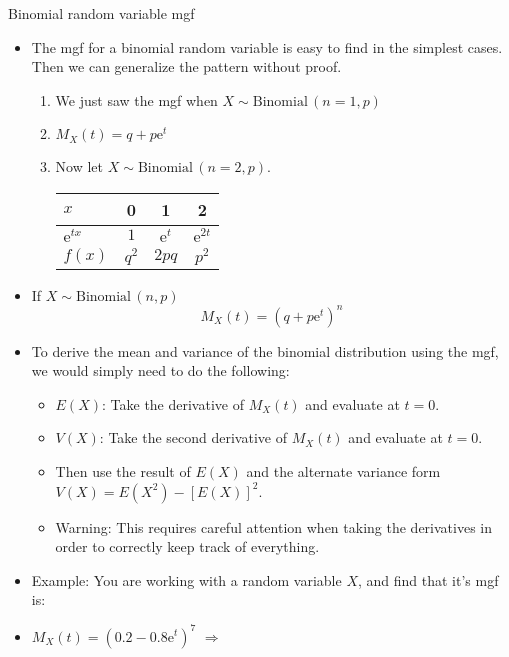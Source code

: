\documentclass{article}
\newcommand{\follow}[1]{\sim \text{#1}\,}		%
\newcommand{\e}{\mathrm{e}}		%
\begin{document}
Binomial random variable mgf\bigskip
\begin{itemize}
    \item The mgf for a binomial random variable is easy to find in the simplest cases. Then we can generalize the pattern without proof.
    \begin{enumerate}
        \item We just saw the mgf when $X \follow{Binomial}(n = 1, p)$
        \item[] $M_X(t) = q + p\e^t$\bigskip
        \item Now let $X \follow{Binomial}(n = 2, p)$.\bigskip\\
        \begin{tabular}{| l || c | c | c |}
            \hline
            $x$ & 0 & 1 & 2\\
            \hline
            $\e^{tx}$ & $1$ & $\e^{t}$ & $\e^{2t}$\\
            \hline
            $f(x)$ & $q^2$ & $2pq$ & $p^2$\\
            \hline
        \end{tabular}\vspace{40pt}
    \end{enumerate}
    \item If $X \follow{Binomial}(n, p)$
    \[M_X(t) = (q + p\e^t)^n\]
    \item To derive the mean and variance of the binomial distribution using the mgf, we would simply need to do the following:
    \begin{itemize}
        \item $E(X)$: Take the derivative of $M_X(t)$ and evaluate at $t = 0$.
        \item $V(X)$: Take the second derivative of $M_X(t)$ and evaluate at $t = 0$.
        \item[] Then use the result of $E(X)$ and the alternate variance form \\ $V(X) = E(X^2) - [E(X)]^2$.
        \item Warning: This requires careful attention when taking the derivatives in order to correctly keep track of everything.
    \end{itemize}
    \item Example: You are working with a random variable $X$, and find that it's mgf is:\smallskip
    \item[] $M_X(t) = (0.2 - 0.8\e^t)^7$  $\Longrightarrow$ 
\end{itemize}\bigskip
\end{document}

